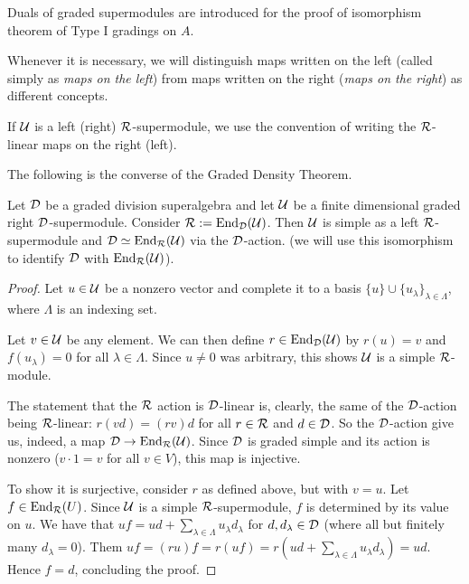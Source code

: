\documentclass{amsbook}
\begin{document}
Duals of graded supermodules are introduced for the proof of isomorphism theorem of Type I gradings on $A$.

\begin{convention}\label{conv:maps-left-right}
    Whenever it is necessary, we will distinguish maps written on the left (called simply as \emph{maps on the left}) from maps written on the  right (\emph{maps on the right}) as different concepts.
    
    If $\mathcal U$ is a left (right) $\mathcal R$-supermodule, we use the convention of writing the $\mathcal R$-linear maps on the right (left).
\end{convention}



The following is the converse of the Graded Density Theorem.

\begin{prop}\label{prop:converse-density-thm}
    Let $\mathcal{D}$ be a graded division superalgebra and let $\mathcal U$ be a finite dimensional graded right $\mathcal{D}$-supermodule. Consider $\mathcal R := \operatorname{End}_{\mathcal{D}} (\mathcal U)$. Then $\mathcal U$ is simple as a left $\mathcal R$-supermodule and $\mathcal{D} \simeq \operatorname{End}_{\mathcal R} (\mathcal U)$ via the $\mathcal{D}$-action.
    (we will use this isomorphism to identify $\mathcal{D}$ with $\operatorname{End}_{\mathcal R} (\mathcal U)$). 
\end{prop}

\begin{proof}
Let $u \in \mathcal U$ be a nonzero vector and complete it to a basis $\{u\} \cup \{ u_\lambda\}_{\lambda \in \Lambda}$, where $\Lambda$ is an indexing set.

Let $v\in \mathcal U$ be any element. We can then define $r\in \operatorname{End}_{\mathcal{D}} (\mathcal U)$ by $r(u) = v$ and $f(u_\lambda) = 0$ for all $\lambda \in \Lambda$. Since $u \neq 0$ was arbitrary, this shows $\mathcal U$ is a simple $\mathcal R$-module. 

The statement that the $\mathcal R$ action is $\mathcal{D}$-linear is, clearly, the same of the $\mathcal{D}$-action being $\mathcal R$-linear: $r(vd) = (rv)d$ for all $r\in \mathcal R$ and $d \in \mathcal{D}$. So the $\mathcal{D}$-action give us, indeed, a map $\mathcal{D} \to \operatorname{End}_{\mathcal R} (\mathcal U)$.
Since $\mathcal{D}$ is graded simple and its action is nonzero ($v\cdot 1 = v$ for all $v \in V$), this map is injective.

To show it is surjective, consider $r$ as defined above, but with $v = u$. Let $f\in \operatorname{End}_{\mathcal R} (U)$. Since $\mathcal U$ is a simple $\mathcal R$-supermodule, $f$ is determined by its value on $u$.
We have that $uf = u d + \sum_{\lambda \in \Lambda} u_\lambda d_\lambda$ for $d, d_\lambda \in \mathcal{D}$ (where all but finitely many $d_\lambda = 0$). 
Them $ uf = (ru)f = r(uf) = r(ud + \sum_{\lambda \in \Lambda} u_\lambda d_\lambda )  = ud$. Hence $f = d$, concluding the proof.
\end{proof}
\end{document}
